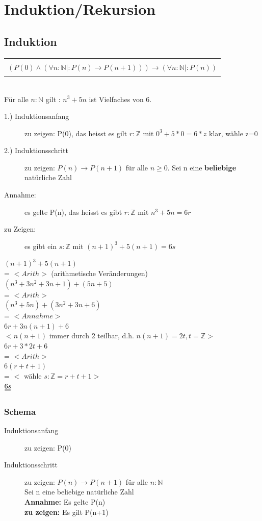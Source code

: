\documentclass[a4paper,10pt]{article}
\newcommand{\NN}{\mathbb{N}} %
\newcommand{\ZN}{\mathbb{Z}} %
\newcommand{\Bold}[1]{\textbf{#1}} %
\newcommand{\ra}{\rightarrow}
\begin{document}
\newpage
\section{Induktion/Rekursion}
\subsection{Induktion}

\begin{tabular}{| c |}
	\hline \\
		$(P(0) \wedge (\forall n : \NN | : P(n) \ra P(n+1))) \ra (\forall n : \NN | : P(n))$ \\ \\
	\hline
\end{tabular} \\
F\"ur alle $n:\NN$ gilt : $n^3+5n$ ist Vielfaches von 6. \\
\begin{description}
	\item[1.) Induktionsanfang] zu zeigen: P(0), das heisst es gilt $r:\ZN$ mit $0^3+5*0=6*z$ klar, w\"ahle z=0
	\item[2.) Induktionsschritt] zu zeigen: $P(n) \ra P(n+1)$ f\"ur alle $n \geq 0$. Sei n eine \Bold {beliebige} nat\"urliche Zahl \\
	\item[Annahme:] es gelte P(n), das heisst es gibt $r:\ZN$ mit $n^3+5n =6r$ 
	\item[zu Zeigen:] es gibt ein $s:\ZN$ mit $(n+1)^3+5(n+1)=6s$
\end{description}
$(n+1)^3 + 5(n+1)$  \\ = $<Arith>$ (arithmetische Ver\"anderungen) \\
$(n^3+3n^2+3n +1)+(5n+5)$ \\ = $<Arith>$ \\
$(n^3+5n) + (3n^2+3n+6)$ \\ = $<Annahme>$ \\
$6r + 3n(n+1)+6$ \\ $<n(n+1)$ immer durch 2 teilbar, d.h. $n(n+1)=2t, t=\ZN>$ \\
$6r +3*2t + 6$ \\ = $<Arith>$ \\
$6(r+t+1)$ \\ = $<$ w\"ahle $s:\ZN=r+t+1>$ \\ $\uuline{6s}$ 

\subsubsection{Schema}
\begin{description}
	\item[Induktionsanfang] zu zeigen: P(0)
	\item[Induktionsschritt] zu zeigen: $P(n) \ra P(n+1)$ f\"ur alle $n:\NN$ \\
		Sei n eine beliebige nat\"urliche Zahl \\
		\Bold {Annahme:} Es gelte P(n) \\
		\Bold {zu zeigen:} Es gilt P(n+1)
\end{description}
\end{document}
